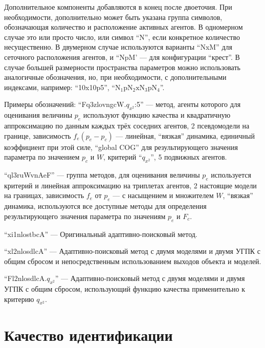 Дополнительное компоненты добавляются в конец после двоеточия.
При необходимости, дополнительно может быть указана группа символов, обозначающая количество
и расположение активных агентов.
В одномерном случае это или просто число, или символ ``N'', если
конкретное количество несущественно. В двумерном случае
используются варианты ``NxM'' для сеточного расположения агентов,
и ``NpM'  --- для конфигурации ``крест''. В случае большей размерности
пространства параметров можно использовать аналогичные обозначения,
но, при необходимости, с дополнительными индексами, например:
``10x10p5'', ``$\mathrm{N_1 p N_2 x N_3 p N_4}$''.



Примеры обозначений:
``Fq3zlovngcW.$q_{x^2}$:5''
--- метод, агенты которого
для оценивания величины $p_e$ используют функцию качества и квадратичную аппроксимацию
по данным каждых трёх соседних агентов, 2 псевдомодели на границе,
зависимость $f_e(p_e-p_c)$ --- линейная, ``вязкая'' динамика,
единичный коэффициент при этой силе,
``global COG'' для результирующего значения параметра по значением $p_c$ и $W$,
критерий ``$q_{x^2}$'', 5 подвижных агентов.


``ql3ruWvnAeF''
--- группа методов,
для оценивания величины $p_e$ используется критерий и линейная аппроксимацию на триплетах агентов,
2 настоящие модели на границах,
зависимость $f_e$ от $p_e$ --- с насыщением и множителем $W$, ``вязкая'' динамика,
используются все доступные методы для определения  результирующего значения параметра
по значениям $p_e$ и $F_c$.

``xi1nlostbcA'' --- Оригинальный адаптивно-поисковый метод.

``xl2nlosdlcA'' --- Адаптивно-поисковый метод с двумя моделями и двумя УГПК с общим сбросом
 и непосредственным использованием выходов объекта и моделей.

``Fl2nlosdlcA.$q_{x^2}$'' --- Адаптивно-поисковый метод с двумя моделями и двумя УГПК с общим сбросом,
 использующий функцию качества применительно к критерию $q_{x^2}$.





\section{Качество идентификации}  %

